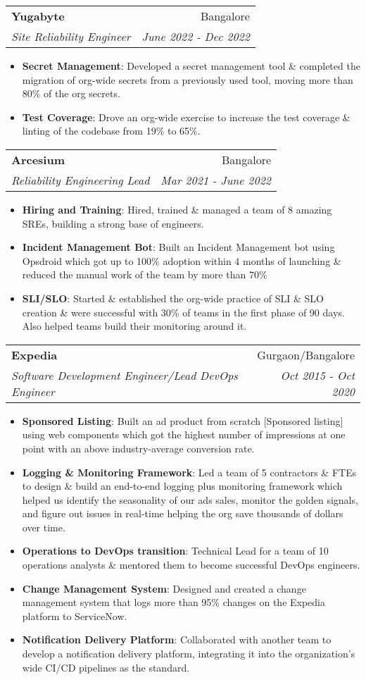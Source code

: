 \documentclass[letterpaper,11pt]{article}
\makeatletter
\newcommand{\resumeItem}[2]{
  \item\small{
    \textbf{#1}{: #2 \vspace{-2pt}}
  }
}
\newcommand{\resumeSubheading}[4]{
  \vspace{-1pt}\item
    \begin{tabular*}{0.97\textwidth}{l@{\extracolsep{\fill}}r}
      \textbf{#1} & #2 \\
      \textit{\small#3} & \textit{\small #4} \\
    \end{tabular*}\vspace{-5pt}
}
\newcommand{\resumeItemListStart}{\begin{itemize}}
\newcommand{\resumeItemListEnd}{\end{itemize}\vspace{-5pt}}
\makeatother
\begin{document}
    \resumeSubheading
      {Yugabyte}{Bangalore}
      {Site Reliability Engineer}{June 2022 - Dec 2022}
      \resumeItemListStart
        \resumeItem{Secret Management}
          {Developed a secret management tool \& completed the migration of org-wide secrets from a previously used tool, moving more than 80\% of the org secrets.}
        \resumeItem{Test Coverage}
          {Drove an org-wide exercise to increase the test coverage \& linting of the codebase from 19\% to 65\%.}
      \resumeItemListEnd

    \resumeSubheading
      {Arcesium}{Bangalore}
      {Reliability Engineering Lead}{Mar 2021 - June 2022}
      \resumeItemListStart
        \resumeItem{Hiring and Training}
          {Hired, trained \& managed a team of 8 amazing SREs, building a strong base of engineers.}
        \resumeItem{Incident Management Bot}
          {Built an Incident Management bot using Opsdroid which got up to 100\% adoption within 4 months of launching \& reduced the manual work of the team by more than 70\%}
        \resumeItem{SLI/SLO}
          {Started \& established the org-wide practice of SLI \& SLO creation \& were successful with 30\% of teams in the first phase of 90 days. Also helped teams build their monitoring around it.}
      \resumeItemListEnd

    \resumeSubheading
      {Expedia}{Gurgaon/Bangalore}
      {Software Development Engineer/Lead DevOps Engineer}{Oct 2015 - Oct 2020}
      \resumeItemListStart
        \resumeItem{Sponsored Listing}
          {Built an ad product from scratch [Sponsored listing] using web components which got the highest number of impressions at one point with an above industry-average conversion rate.}
        \resumeItem{Logging \& Monitoring Framework}
          {Led a team of 5 contractors \& FTEs to design \& build an end-to-end logging plus monitoring framework which helped us identify the seasonality of our ads sales, monitor the golden signals, and figure out issues in real-time helping the org save thousands of dollars over time.}
        \resumeItem{Operations to DevOps transition}
          {Technical Lead for a team of 10 operations analysts \& mentored them to become successful DevOps engineers.}
        \resumeItem{Change Management System}
          {Designed and created a change management system that logs more than 95\% changes on the Expedia platform to ServiceNow.}
        \resumeItem{Notification Delivery Platform}
          {Collaborated with another team to develop a notification delivery platform, integrating it into the organization's wide CI/CD pipelines as the standard.}
      \resumeItemListEnd
\end{document}
